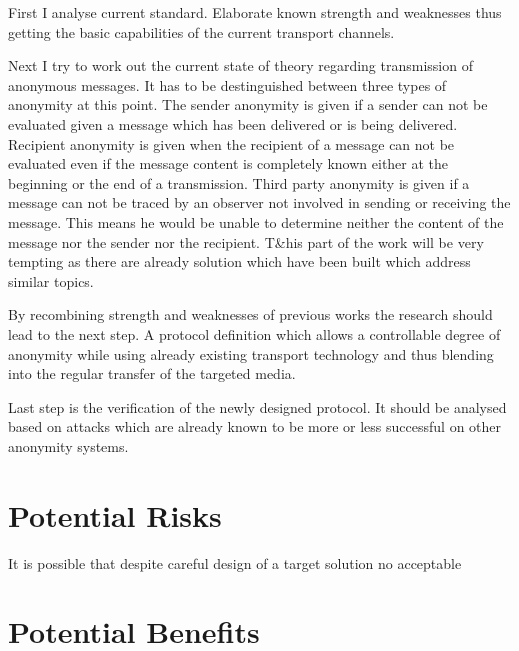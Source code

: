 \documentclass[twocolumn,a4paper]{article}
\begin{document}
First I analyse current standard. Elaborate known strength and weaknesses thus getting the basic capabilities of the current transport channels. \par

Next I try to work out the current state of theory regarding transmission of anonymous messages. It has to be destinguished between three types of anonymity at this point. The sender anonymity is given if a sender can not be evaluated given a message which has been delivered or is being delivered. Recipient anonymity is given when the recipient of a message can not be evaluated even if the message content is completely known either at the beginning or the end of a transmission. Third party anonymity is given if a message can not be traced by an observer not involved in sending or receiving the message. This means he would be unable to determine neither the content of the message nor the sender nor the recipient. T&his part of the work will be very tempting as there are already solution which have been built which address similar topics.\par

By recombining strength and weaknesses of previous works the research should lead to the next step. A protocol definition which allows a controllable degree of anonymity while using already existing transport technology and thus blending into the regular transfer of the targeted media. \par

Last step is the verification of the newly designed protocol. It should be analysed based on attacks which are already known to be more or less successful on other anonymity systems.\par

\section{Potential Risks}
It is possible that despite careful design of a target solution no acceptable
\section{Potential Benefits}
\end{document}
